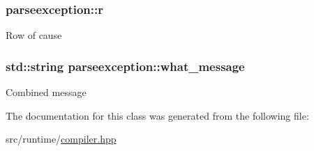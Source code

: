 \subsubsection[{\texorpdfstring{r}{r}}]{ parseexception\+::r}\hypertarget{classparseexception_a0e50402f7511e71332099355061b26ca}{}\label{classparseexception_a0e50402f7511e71332099355061b26ca}
Row of cause 
\subsubsection[{\texorpdfstring{what\+\_\+message}{what_message}}]{\setlength{\rightskip}{0pt plus 5cm}std\+::string parseexception\+::what\+\_\+message\hspace{0.3cm}{\ttfamily [private]}}\hypertarget{classparseexception_a4807889c64609ea29a275c9f66c15e61}{}\label{classparseexception_a4807889c64609ea29a275c9f66c15e61}
Combined message 

The documentation for this class was generated from the following file\+:\begin{DoxyCompactItemize}
\item 
src/runtime/\hyperlink{compiler_8hpp}{compiler.\+hpp}\end{DoxyCompactItemize}
